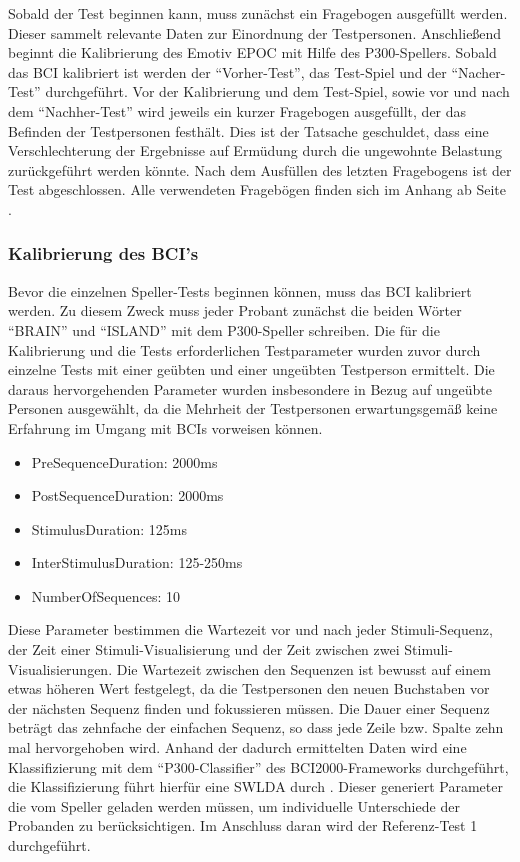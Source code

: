 Sobald der Test beginnen kann, muss zunächst ein Fragebogen ausgefüllt werden.
Dieser sammelt relevante Daten zur Einordnung der Testpersonen.
Anschließend beginnt die Kalibrierung des Emotiv EPOC mit Hilfe des P300-Spellers.
Sobald das BCI kalibriert ist werden der "`Vorher-Test"', das Test-Spiel und der "`Nacher-Test"' durchgeführt.
Vor der Kalibrierung und dem Test-Spiel, sowie vor und nach dem "`Nachher-Test"' wird jeweils ein kurzer Fragebogen ausgefüllt, der das Befinden der Testpersonen festhält.
Dies ist der Tatsache geschuldet, dass eine Verschlechterung der Ergebnisse auf Ermüdung durch die ungewohnte Belastung zurückgeführt werden könnte.
Nach dem Ausfüllen des letzten Fragebogens ist der Test abgeschlossen.
Alle verwendeten Fragebögen finden sich im Anhang ab Seite \pageref{anhang}.\\



\subsubsection{Kalibrierung des \acs{BCI}'s}

Bevor die einzelnen Speller-Tests beginnen können, muss das \acs{BCI} kalibriert werden.
Zu diesem Zweck muss jeder Probant zunächst die beiden Wörter \mbox{"`BRAIN"'} und \mbox{"`ISLAND"'} mit dem P300-Speller schreiben.
Die für die Kalibrierung und die Tests erforderlichen Testparameter wurden zuvor durch einzelne Tests mit einer geübten und einer ungeübten Testperson ermittelt.
Die daraus hervorgehenden Parameter wurden insbesondere in Bezug auf ungeübte Personen ausgewählt, 
da die Mehrheit der Testpersonen erwartungsgemäß keine Erfahrung im Umgang mit \acs{BCI}s vorweisen können.
\begin{itemize}
\item PreSequenceDuration: 2000ms
\item PostSequenceDuration: 2000ms
\item StimulusDuration: 125ms
\item InterStimulusDuration: 125-250ms
\item NumberOfSequences: 10 \\
\end{itemize}
Diese Parameter bestimmen die Wartezeit vor und nach jeder Stimuli-Sequenz, der Zeit \mbox{einer} Stimuli-Visualisierung und der Zeit zwischen zwei Stimuli-Visualisierungen.
Die Wartezeit zwischen den Sequenzen ist bewusst auf einem etwas höheren Wert festgelegt, da die Testpersonen den neuen Buchstaben vor der nächsten Sequenz finden und fokussieren müssen.
Die Dauer einer Sequenz beträgt das zehnfache der einfachen Sequenz, so dass jede Zeile bzw. Spalte zehn mal hervorgehoben wird.
Anhand der dadurch ermittelten Daten wird eine Klassifizierung mit dem "`P300-Classifier"' des BCI2000-Frameworks durchgeführt, 
die Klassifizierung führt hierfür eine \ac{SWLDA} durch \cite[S.208ff]{schalk2010practical}.
Dieser generiert Parameter die vom Speller geladen werden müssen, um individuelle Unterschiede der Probanden zu berücksichtigen.
Im Anschluss daran wird der Referenz-Test 1 durchgeführt.




